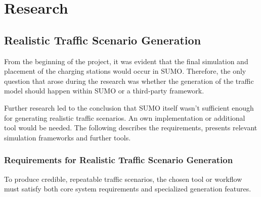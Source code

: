 \section{Research}

\subsection{Realistic Traffic Scenario Generation}
From the beginning of the project, it was evident that the final simulation and placement of the charging stations would occur in SUMO. Therefore, the only question that arose during the research was whether the generation of the traffic model should happen within SUMO or a third-party framework.

Further research led to the conclusion that SUMO itself wasn't sufficient enough for generating realistic traffic scenarios. An own implementation or additional tool would be needed. The following describes the requirements, presents relevant simulation frameworks and further tools.

\subsubsection{Requirements for Realistic Traffic Scenario Generation}
To produce credible, repeatable traffic scenarios, the chosen tool or workflow must satisfy both core system requirements and specialized generation features.


